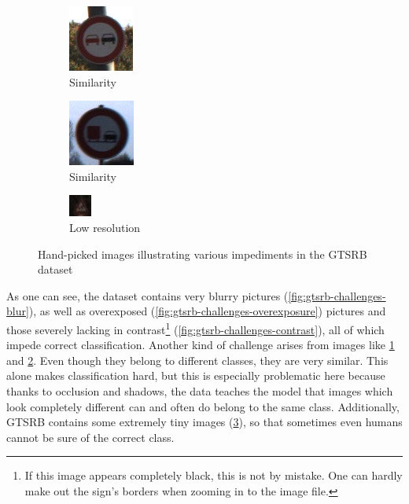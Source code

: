 \documentclass[11pt, a4paper]{article}
\begin{document}
\begin{figure}[h!tb]
    \begin{subfigure}[t]{0.30\textwidth}
    		\centering
        \includegraphics{gtsrb/problems/class09_00004_00029.jpg}
        \caption{Similarity}
        \label{fig:gtsrb-challenges-similar-a}
    \end{subfigure}
    \begin{subfigure}[t]{0.30\textwidth}
    		\centering
        \includegraphics{gtsrb/problems/class10_00025_00029.jpg}
        \caption{Similarity}
        \label{fig:gtsrb-challenges-similar-b}
    \end{subfigure}
    \begin{subfigure}[t]{0.30\textwidth}
    		\centering
        \includegraphics{gtsrb/problems/class28_00012_00003.jpg}
        \caption{Low resolution}
        \label{fig:gtsrb-challenges-resolution}
    \end{subfigure}
    \caption{Hand-picked images illustrating various impediments in the GTSRB dataset}
    \label{fig:gtsrb-challenges}
\end{figure}

As one can see, the dataset contains very blurry pictures (\ref{fig:gtsrb-challenges-blur}), as well as overexposed (\ref{fig:gtsrb-challenges-overexposure}) pictures and those severely lacking in contrast\footnote{If this image appears completely black, this is not by mistake. One can hardly make out the sign's borders when zooming in to the image file.} (\ref{fig:gtsrb-challenges-contrast}), all of which impede correct classification. Another kind of challenge arises from images like \ref{fig:gtsrb-challenges-similar-a} and \ref{fig:gtsrb-challenges-similar-b}. Even though they belong to different classes, they are very similar. This alone makes classification hard, but this is especially problematic here because thanks to occlusion and shadows, the data teaches the model that images which look completely different can and often do belong to the same class. Additionally, GTSRB contains some extremely tiny images (\ref{fig:gtsrb-challenges-resolution}), so that sometimes even humans cannot be sure of the correct class.
\end{document}
